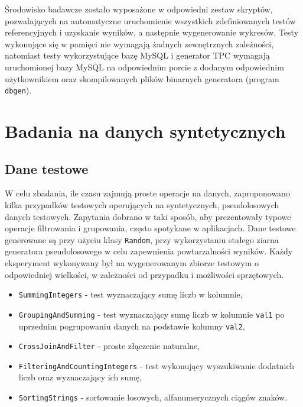 \documentclass[12pt]{extarticle}
\begin{document}
    Środowisko badawcze zostało wyposażone w odpowiedni zestaw skryptów, pozwalających na automatyczne uruchomienie wszystkich zdefiniowanych testów referencyjnych i uzyskanie wyników, a następnie wygenerowanie wykresów. Testy wykonujące się w pamięci nie wymagają żadnych zewnętrznych zależności, natomiast testy wykorzystujące bazę MySQL i generator TPC wymagają uruchomionej bazy MySQL na odpowiednim porcie z dodanym odpowiednim użytkownikiem oraz skompilowanych plików binarnych generatora (program \texttt{dbgen}).


\section{Badania na danych syntetycznych}

\subsection{Dane testowe}

    W celu zbadania, ile czasu zajmują proste operacje na danych, zaproponowano kilka przypadków testowych operujących na syntetycznych, pseudolosowych danych testowych. Zapytania dobrano w taki sposób, aby prezentowały typowe operacje filtrowania i grupowania, często spotykane w aplikacjach. Dane testowe generowane są przy użyciu klasy \texttt{Random}, przy wykorzystaniu stałego ziarna generatora pseudolosowego w celu zapewnienia powtarzalności wyników. Każdy eksperyment wykonywany był na wygenerowanym zbiorze testowym o odpowiedniej wielkości, w zależności od przypadku i możliwości sprzętowych.

\begin{itemize}
    \item \texttt{SummingIntegers} - test wyznaczający sumę liczb w kolumnie,
    \item \texttt{GroupingAndSumming} - test wyznaczający sumę liczb w kolumnie \texttt{val1} po uprzednim pogrupowaniu danych na podstawie kolumny \texttt{val2},
    \item \texttt{CrossJoinAndFilter} - proste złączenie naturalne,
    \item \texttt{FilteringAndCountingIntegers} - test wykonujący wyszukiwanie dodatnich liczb oraz wyznaczający ich sumę,
    \item \texttt{SortingStrings} - sortowanie losowych, alfanumerycznych ciągów znaków.
\end{itemize}

\newpage
\end{document}
